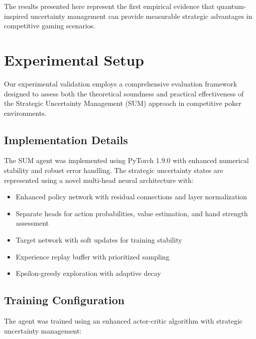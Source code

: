 \documentclass[11pt,a4paper]{article}
\begin{document}
The results presented here represent the first empirical evidence that quantum-inspired uncertainty management can provide measurable strategic advantages in competitive gaming scenarios.

\section{Experimental Setup}

Our experimental validation employs a comprehensive evaluation framework designed to assess both the theoretical soundness and practical effectiveness of the Strategic Uncertainty Management (SUM) approach in competitive poker environments.

\subsection{Implementation Details}

The SUM agent was implemented using PyTorch 1.9.0 with enhanced numerical stability and robust error handling. The strategic uncertainty states are represented using a novel multi-head neural architecture with:

\begin{itemize}
\item Enhanced policy network with residual connections and layer normalization
\item Separate heads for action probabilities, value estimation, and hand strength assessment
\item Target network with soft updates for training stability
\item Experience replay buffer with prioritized sampling
\item Epsilon-greedy exploration with adaptive decay
\end{itemize}

\subsection{Training Configuration}

The agent was trained using an enhanced actor-critic algorithm with strategic uncertainty management:
\end{document}
